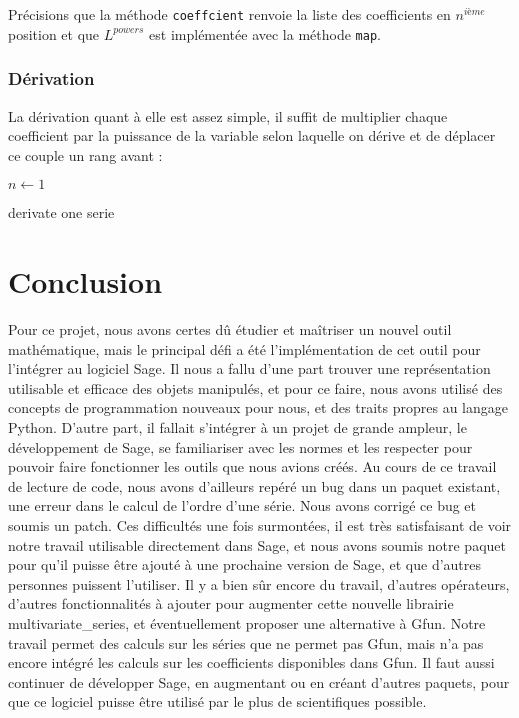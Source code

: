\documentclass[12pt]{report}
\begin{document}
Précisions que la méthode \verb|coeffcient| renvoie la liste des coefficients
en $n^{ième} $ position et que $L^{powers}$ est implémentée avec la méthode \verb|map|.

\subsection{Dérivation}
La dérivation quant à elle est assez simple, il suffit de multiplier chaque
coefficient par la puissance de la variable selon laquelle on dérive et de
déplacer ce couple un rang avant :

\begin{algorithm}
\DontPrintSemicolon
{}

\BlankLine
$n \leftarrow 1 $\;
\caption{derivate one serie}
\end{algorithm}

\chapter*{Conclusion}
Pour ce projet, nous avons certes dû étudier et maîtriser un nouvel outil mathématique, mais le principal défi a été l’implémentation de cet outil pour l’intégrer au logiciel Sage. 
Il nous a fallu d’une part trouver une représentation utilisable et efficace des objets manipulés, et pour ce faire, nous avons utilisé des concepts de programmation nouveaux pour nous, et des traits propres au langage Python. 
D’autre part, il fallait s’intégrer à un projet de grande ampleur, le développement de Sage, se familiariser avec les normes et les respecter pour pouvoir faire fonctionner les outils que nous avions créés. Au cours de ce travail de lecture de code, nous avons d’ailleurs repéré un bug dans un paquet existant, une erreur dans le calcul de l’ordre d’une série. Nous avons corrigé ce bug et soumis un patch. Ces difficultés une fois surmontées, il est très satisfaisant de voir notre travail utilisable directement dans Sage, et nous avons soumis notre paquet pour qu’il puisse être ajouté à une prochaine version de Sage, et que d’autres personnes puissent l’utiliser. 
Il y a bien sûr encore du travail, d’autres opérateurs, d’autres fonctionnalités à ajouter pour augmenter cette nouvelle librairie multivariate\_series, et éventuellement proposer une alternative à Gfun. Notre travail permet des calculs sur les séries que ne permet pas Gfun, mais n’a pas encore intégré les calculs sur les coefficients disponibles dans Gfun. Il faut aussi continuer de développer Sage, en augmentant ou en créant d’autres paquets, pour que ce logiciel puisse être utilisé par le plus de scientifiques possible.



\end{document}
